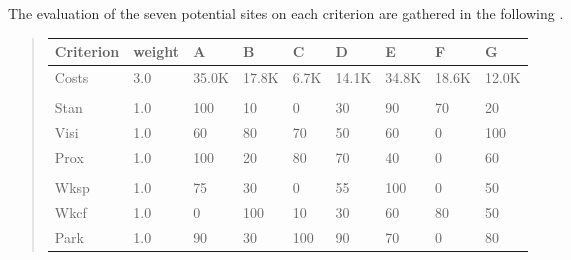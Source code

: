 \documentclass[a4paper,10pt,english]{sphinxhowto}
\begin{document}
The evaluation of the seven potential sites on each criterion are gathered in the following .
\begin{quote}


\begin{savenotes}\sphinxattablestart
\centering
\begin{tabulary}{\linewidth}[t]{|T|T|T|T|T|T|T|T|T|}
\hline
\sphinxstyletheadfamily 
Criterion
&\sphinxstyletheadfamily 
weight
&\sphinxstyletheadfamily 
A
&\sphinxstyletheadfamily 
B
&\sphinxstyletheadfamily 
C
&\sphinxstyletheadfamily 
D
&\sphinxstyletheadfamily 
E
&\sphinxstyletheadfamily 
F
&\sphinxstyletheadfamily 
G
\\
\hline
Costs
&
3.0
&
35.0K\texteuro{}
&
17.8K\texteuro{}
&
6.7K\texteuro{}
&
14.1K\texteuro{}
&
34.8K\texteuro{}
&
18.6K\texteuro{}
&
12.0K\texteuro{}
\\
\hline

&

&

&

&

&

&

&

&

\\
\hline
Stan
&
1.0
&
100
&
10
&
0
&
30
&
90
&
70
&
20
\\
\hline
Visi
&
1.0
&
60
&
80
&
70
&
50
&
60
&
0
&
100
\\
\hline
Prox
&
1.0
&
100
&
20
&
80
&
70
&
40
&
0
&
60
\\
\hline

&

&

&

&

&

&

&

&

\\
\hline
Wksp
&
1.0
&
75
&
30
&
0
&
55
&
100
&
0
&
50
\\
\hline
Wkcf
&
1.0
&
0
&
100
&
10
&
30
&
60
&
80
&
50
\\
\hline
Park
&
1.0
&
90
&
30
&
100
&
90
&
70
&
0
&
80
\\
\hline
\end{tabulary}
\par
\sphinxattableend\end{savenotes}
\end{quote}
\end{document}
